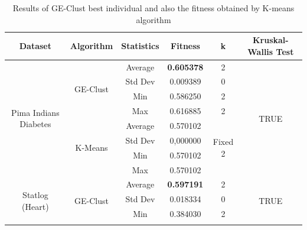 \documentclass[conference,compsoc]{IEEEtran}
\begin{document}
\begin{table}[]
	\centering
	\caption{Results of GE-Clust best individual and also the fitness obtained by K-means algorithm}
	\label{results-ge-and-kmeans}
	\begin{tabular}{|c|c|c|c|c|c|}
		\hline
		\textbf{Dataset}           & \textbf{Algorithm} & \textbf{Statistics} & \textbf{Fitness} & \textbf{k}    & \textbf{Kruskal-Wallis Test}   \\ \hline
		\multirow{8}{*}{Pima Indians Diabetes} & \multirow{4}{*}{GE-Clust}           & Average                        & \textbf{0.605378}                    & 2                        & \multirow{8}{*}{TRUE} \\ \cline{3-5}
		&                               & Std Dev                        & 0.009389                    & 0                        &                       \\ \cline{3-5}
		&                               & Min                            & 0.586250                    & 2                        &                       \\ \cline{3-5}
		&                               & Max                            & 0.616885                   & 2                        &                       \\ \cline{2-5}
		& \multirow{4}{*}{K-Means}      & Average                        & 0.570102                   & \multirow{4}{*}{Fixed 2} &                       \\ \cline{3-4}
		&                               & Std Dev                        & 0,000000                   &                          &                       \\ \cline{3-4}
		&                               & Min                            & 0.570102                   &                          &                       \\ \cline{3-4}
		&                               & Max                            & 0.570102                   &                          &                       \\ \hline
		\multirow{8}{*}{Statlog (Heart)}       & \multirow{4}{*}{GE-Clust}           & Average                        & \textbf{0.597191}                    & 2                        & \multirow{8}{*}{TRUE} \\ \cline{3-5}
		&                               & Std Dev                        & 0.018334                    & 0                        &                       \\ \cline{3-5}
		&                               & Min                            & 0.384030                    & 2                        &                       \\ \cline{3-5}

\end{tabular}
\end{table}
\end{document}
